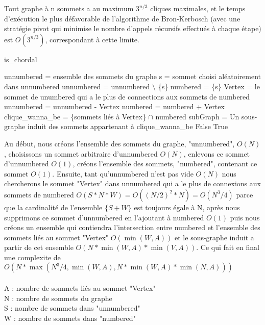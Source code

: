 \documentclass{article}
\begin{document}
\cite{Algo1} Tout graphe à n sommets a au maximum $3^{n/3}$ cliques maximales, et le temps d'exécution le plus défavorable de l'algorithme de Bron-Kerbosch (avec une stratégie pivot qui minimise le nombre d'appels récursifs effectués à chaque étape) est $O(3^{n/3})$, correspondant à cette limite.


		\begin{algorithm}[H]
		\caption{is\_chordal}
		\begin{algorithmic}[1]		
		
		\STATE unnumbered = ensemble des sommets du graphe
		\STATE s = sommet choisi aléatoirement dans unnumbered
		\STATE unnumbered = unnumbered $\setminus$ \{s\}
		\STATE numbered  = \{s\}
			\STATE Vertex = le sommet de unumbered qui a le plus de connections aux sommets de numbered
			\STATE unnumbered = unnumbered - Vertex
			\STATE numbered = numbered + Vertex
			\STATE clique\_wanna\_be = \{sommets liés à Vertex\} $\cap$ numbered
			\STATE subGraph	= Un sous-graphe induit des sommets appartenant à clique\_wanna\_be
				\RETURN False
			\ENDIF
		\ENDWHILE
		\RETURN True
		\end{algorithmic}
		\end{algorithm}

\cite{Algo2} Au début, nous créons l'ensemble des sommets du graphe, "unnumbered", $O(N)$, choisissons un sommet 
arbitraire d'unnumbered $O(N)$, enlevons ce sommet d'unnumbered $O(1)$,
créons l'ensemble des sommets, "numbered", contenant ce sommet $O(1)$.
Ensuite, tant qu'unnumbered n'est pas vide $O(N)$ nous chercherons
le sommet "Vertex" dans unnumbered qui a le plus de connexions aux sommets 
de numbered $O(S * N * W) = O((N/2)^2*N) = O(N^3/4)$ parce que la cardinalité 
de l'ensemble $\{S+W\}$ est toujours égale à N, après nous supprimons ce sommet d'unnumbered en 
l'ajoutant à numbered $O(1)$ puis nous créons un ensemble qui contiendra 
l'intersection entre numbered et l'ensemble des sommets liés au sommet "Vertex" $O(\min(W,A))$ et le 
sous-graphe induit a partir de cet ensemble $O(N*\min(W,A)*\min(V,A))$.
Ce qui fait en final une complexite de
$O(N*\max(N^3/4,\min(W,A),N*\min(W,A)*\min(N,A)))$\\\\
\noindent
A : nombre de sommets liés au sommet "Vertex"\\
N : nombre de sommets du graphe\\
S : nombre de sommets dans "unnumbered"\\
W : nombre de sommets dans "numbered"
		
\end{document}
